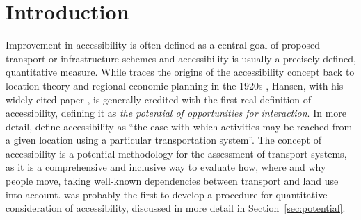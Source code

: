 \section{Introduction}
Improvement in accessibility is often defined as a central goal of proposed transport or infrastructure 
schemes \citep{GeursEtAl2012AccessibilityTransportIntroduction} and 
accessibility is usually a precisely-defined, quantitative measure. While 
\citet{Batty2009AccessibilityUnifiedTheory} traces the origins of the accessibility concept back to 
location theory and regional economic planning in the 1920s \citep[when transport planning began in North America;][]{GeursEtAl2012AccessibilityTransportIntroduction}, 
Hansen, with his widely-cited paper \citep{Hansen1959HowAccessibilityShapesLandUse}, is generally credited 
with the first real definition of accessibility, defining it  
as \emph{the potential of opportunities for interaction}.
In more detail, \citet{MorrisEtAl1979AccessibilityIndicators} define accessibility as ``the ease with 
which activities may be reached from a given location using a particular transportation system''.
The concept of accessibility is a potential methodology for the assessment 
of transport systems, as it is a comprehensive and inclusive way to evaluate how, where and why 
people move, taking well-known dependencies between transport and land use into account.
\citet{Hansen1959HowAccessibilityShapesLandUse} was probably the first to develop a procedure for 
quantitative consideration of accessibility, discussed in more detail in Section~\ref{sec:potential}.



